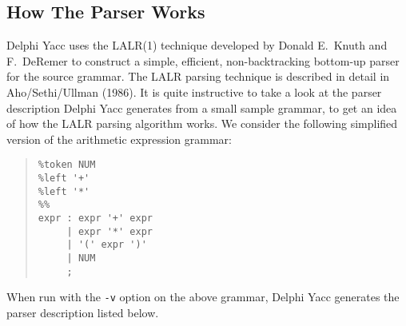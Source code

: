 \documentclass[a4paper]{article}
\begin{document}
\subsection{How The Parser Works}

Delphi Yacc uses the LALR(1) technique developed by Donald E.\ Knuth and F.\
DeRemer to construct a simple, efficient, non-backtracking bottom-up
parser for the source grammar. The LALR parsing technique is described
in detail in Aho/Sethi/Ullman (1986). It is quite instructive to take a
look at the parser description Delphi Yacc generates from a small sample
grammar, to get an idea of how the LALR parsing algorithm works. We
consider the following simplified version of the arithmetic expression
grammar:

\begin{quote}\begin{verbatim}
%token NUM
%left '+'
%left '*'
%%
expr : expr '+' expr
     | expr '*' expr
     | '(' expr ')'
     | NUM
     ;
\end{verbatim}\end{quote}

When run with the \verb"-v" option on the above grammar, Delphi Yacc generates
the parser description listed below.
\end{document}
